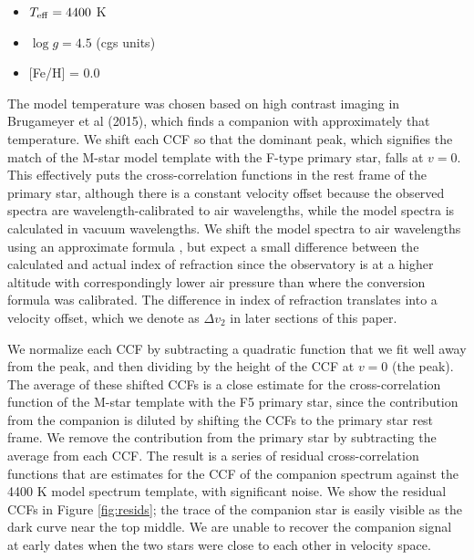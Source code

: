 \documentclass[twocolumn]{emulateapj}
\begin{document}
\begin{itemize}
\item $T_{\rm eff} = 4400$ K
\item $\log{g} = 4.5$ (cgs units)
\item {[}Fe/H{]} = 0.0
\end{itemize}

The model temperature was chosen based on high contrast imaging in Brugameyer et al (2015), which finds a companion with approximately that temperature. We shift each CCF so that the dominant peak, which signifies the match of the M-star model template with the F-type primary star, falls at $v=0$. This effectively puts the cross-correlation functions in the rest frame of the primary star, although there is a constant velocity offset because the observed spectra are wavelength-calibrated to air wavelengths, while the model spectra is calculated in vacuum wavelengths. We shift the model spectra to air wavelengths using an approximate formula \citep{Ciddor96}, but expect a small difference between the calculated and actual index of refraction since the observatory is at a higher altitude with correspondingly lower air pressure than where the conversion formula was calibrated. The difference in index of refraction translates into a velocity offset, which we denote as $\Delta v_2$ in later sections of this paper.

We normalize each CCF by subtracting a quadratic function that we fit well away from the peak, and then dividing by the height of the CCF at $v=0$ (the peak). The average of these shifted CCFs is a close estimate for the cross-correlation function of the M-star template with the F5 primary star, since the contribution from the companion is diluted by shifting the CCFs to the primary star rest frame. We remove the contribution from the primary star by subtracting the average from each CCF. The result is a series of residual cross-correlation functions that are estimates for the CCF of the companion spectrum against the 4400 K model spectrum template, with significant noise. We show the residual CCFs in Figure \ref{fig:resids}; the trace of the companion star is easily visible as the dark curve near the top middle. We are unable to recover the companion signal at early dates when the two stars were close to each other in velocity space.
\end{document}

